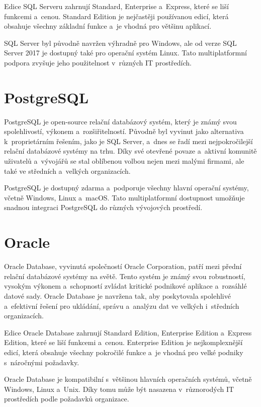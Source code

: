 \documentclass[czech, kiv, ba, he, iso690auyr, pdf]{fasthesis}
\begin{document}
Edice SQL Serveru zahrnují Standard, Enterprise a~Express, 
které se liší funkcemi a~cenou. Standard Edition je nejčastěji používanou edicí, 
která obsahuje všechny základní funkce a~je vhodná pro většinu aplikací.

SQL Server byl původně navržen výhradně pro Windows, ale od verze SQL Server 2017 je dostupný 
také pro operační systém Linux. Tato multiplatformní podpora zvyšuje jeho použitelnost 
v~různých IT prostředích.
\cite{microsoft_sql_server}

\section{PostgreSQL}
PostgreSQL je open-source relační databázový systém, který je známý svou spolehlivostí, výkonem 
a~rozšiřitelností. Původně byl vyvinut jako alternativa k~proprietárním řešením, jako je SQL Server, 
a~dnes se řadí mezi nejpokročilejší relační databázové systémy na trhu. Díky své otevřené povaze 
a~aktivní komunitě uživatelů a~vývojářů se stal oblíbenou volbou nejen mezi malými firmami, 
ale také ve středních a~velkých organizacích.

PostgreSQL je dostupný zdarma a~podporuje všechny hlavní operační systémy, včetně Windows, Linux a~macOS. 
Tato multiplatformní dostupnost umožňuje snadnou integraci PostgreSQL do různých vývojových prostředí.
\cite{postgresql}

\section{Oracle}
Oracle Database, vyvinutá společností Oracle Corporation, patří mezi přední relační 
databázové systémy na světě. Tento systém je známý svou robustností, vysokým výkonem 
a~schopností zvládat kritické podnikové aplikace a~rozsáhlé datové sady. Oracle Database 
je navržena tak, aby poskytovala spolehlivé a~efektivní řešení pro ukládání, správu 
a~analýzu dat ve velkých i~středních organizacích.

Edice Oracle Database zahrnují Standard Edition, Enterprise Edition a~Express Edition,
které se liší funkcemi a~cenou. Enterprise Edition je nejkomplexnější edicí, která
obsahuje všechny pokročilé funkce a~je vhodná pro velké podniky s~náročnými požadavky.

Oracle Database je kompatibilní s~většinou hlavních operačních systémů, včetně Windows, 
Linux a~Unix. Díky tomu může být nasazena v~různorodých IT prostředích podle požadavků organizace.
\cite{oracle_database}
\end{document}
